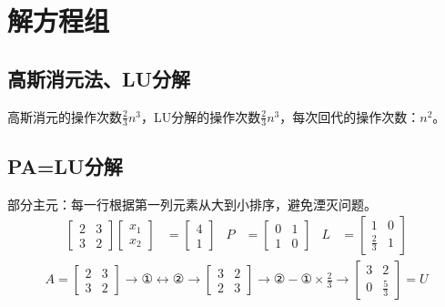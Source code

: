 \documentclass[twocolumn]{article}
\begin{document}
\section{解方程组}

\subsection{高斯消元法、LU分解}
高斯消元的操作次数$\frac{2}{3}n^3$，LU分解的操作次数$\frac{2}{3}n^3$，每次回代的操作次数：$n^2$。

\subsection{PA=LU分解}
部分主元：每一行根据第一列元素从大到小排序，避免湮灭问题。
\begin{align*}
    \begin{bmatrix}
        2 & 3 \\
        3 & 2
    \end{bmatrix}
    \begin{bmatrix}
        x_1 \\
        x_2
    \end{bmatrix}
     & =
    \begin{bmatrix}
        4 \\
        1
    \end{bmatrix}
     & P & =
    \begin{bmatrix}
        0 & 1 \\
        1 & 0
    \end{bmatrix}
     & L & =
    \begin{bmatrix}
        1           & 0 \\
        \frac{2}{3} & 1
    \end{bmatrix}
\end{align*}
\begin{align*}
    A=
    \begin{bmatrix}
        2 & 3 \\
        3 & 2
    \end{bmatrix}
    \rightarrow ① \leftrightarrow ② \rightarrow
    \begin{bmatrix}
        3 & 2 \\
        2 & 3
    \end{bmatrix}
    \rightarrow ②-①\times\frac{2}{3}\rightarrow
    \begin{bmatrix}
        3 & 2           \\
        0 & \frac{5}{3}
    \end{bmatrix}
    =U
\end{align*}
\end{document}
